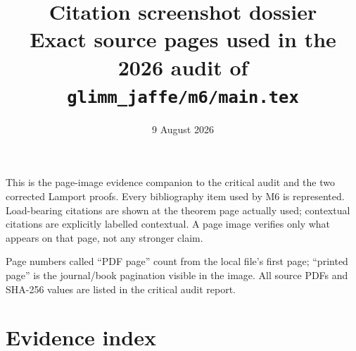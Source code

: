 \documentclass[10pt,a4paper]{article}
\title{Citation screenshot dossier\\[3pt]
\large Exact source pages used in the 2026 audit of \texttt{glimm\_jaffe/m6/main.tex}}
\author{}
\date{9 August 2026}
\begin{document}
\maketitle

\begin{resultbox}
This is the page-image evidence companion to the critical audit and the two corrected
Lamport proofs.  Every bibliography item used by M6 is represented.  Load-bearing
citations are shown at the theorem page actually used; contextual citations are explicitly
labelled contextual.  A page image verifies only what appears on that page, not any stronger
claim.

Page numbers called ``PDF page'' count from the local file's first page; ``printed page'' is
the journal/book pagination visible in the image.  All source PDFs and SHA-256 values are
listed in the critical audit report.
\end{resultbox}

\tableofcontents

\section{Evidence index}
\end{document}
